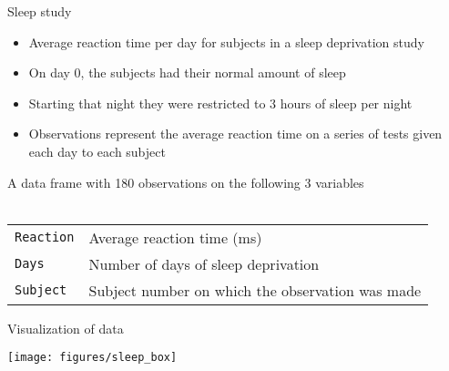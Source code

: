 \documentclass{beamer}
\begin{document}
\begin{frame}{Sleep study}
  \begin{itemize}
    \item Average reaction time per day for subjects in a sleep deprivation
      study
    \item On day 0, the subjects had their normal amount of sleep
    \item Starting that night they were restricted to 3 hours of sleep per
      night
    \item Observations represent the average reaction time on a series of
      tests given each day to each subject
  \end{itemize}

  A data frame with 180 observations on the following 3 variables\\~\\

  \begin{tabular}{lp{8cm}}
    \hline
     \texttt{Reaction} & Average reaction time (ms) \\
     \texttt{Days} & Number of days of sleep deprivation \\
     \texttt{Subject} & Subject number on which the observation was made \\
     \hline
  \end{tabular}
\end{frame}


\begin{frame}{Visualization of data}
  \begin{center}
      \texttt{[image: figures/sleep\_box]}
  \end{center}
\end{frame}
\end{document}
